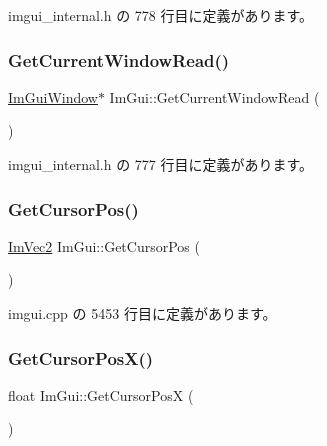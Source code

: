  imgui\+\_\+internal.\+h の 778 行目に定義があります。

\mbox{\label{namespace_im_gui_a408f9ddac92f8629a7e273ced5f8c3aa}} 
\subsubsection{\texorpdfstring{Get\+Current\+Window\+Read()}{GetCurrentWindowRead()}}
{\footnotesize\ttfamily \mbox{\hyperlink{struct_im_gui_window}{Im\+Gui\+Window}}$\ast$ Im\+Gui\+::\+Get\+Current\+Window\+Read (\begin{DoxyParamCaption}{ }\end{DoxyParamCaption})\hspace{0.3cm}{\ttfamily [inline]}}



 imgui\+\_\+internal.\+h の 777 行目に定義があります。

\mbox{\label{namespace_im_gui_a2fa4eb57e0f73b90e8edcd226a0cc7d5}} 
\subsubsection{\texorpdfstring{Get\+Cursor\+Pos()}{GetCursorPos()}}
{\footnotesize\ttfamily \mbox{\hyperlink{struct_im_vec2}{Im\+Vec2}} Im\+Gui\+::\+Get\+Cursor\+Pos (\begin{DoxyParamCaption}{ }\end{DoxyParamCaption})}



 imgui.\+cpp の 5453 行目に定義があります。

\mbox{\label{namespace_im_gui_a022e32c808ac899e25847f4d65633b77}} 
\subsubsection{\texorpdfstring{Get\+Cursor\+Pos\+X()}{GetCursorPosX()}}
{\footnotesize\ttfamily float Im\+Gui\+::\+Get\+Cursor\+PosX (\begin{DoxyParamCaption}{ }\end{DoxyParamCaption})}



